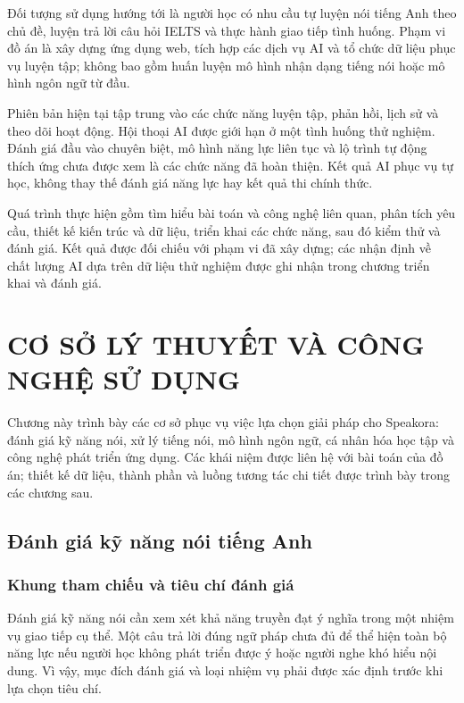 \documentclass[12pt,a4paper,oneside]{report}
\newcommand{\tieudetrang}[1]{\markboth{#1}{}}
\begin{document}
Đối tượng sử dụng hướng tới là người học có nhu cầu tự luyện nói tiếng Anh theo chủ đề, luyện trả lời câu hỏi IELTS và thực hành giao tiếp tình huống. Phạm vi đồ án là xây dựng ứng dụng web, tích hợp các dịch vụ AI và tổ chức dữ liệu phục vụ luyện tập; không bao gồm huấn luyện mô hình nhận dạng tiếng nói hoặc mô hình ngôn ngữ từ đầu.

Phiên bản hiện tại tập trung vào các chức năng luyện tập, phản hồi, lịch sử và theo dõi hoạt động. Hội thoại AI được giới hạn ở một tình huống thử nghiệm. Đánh giá đầu vào chuyên biệt, mô hình năng lực liên tục và lộ trình tự động thích ứng chưa được xem là các chức năng đã hoàn thiện. Kết quả AI phục vụ tự học, không thay thế đánh giá năng lực hay kết quả thi chính thức.

Quá trình thực hiện gồm tìm hiểu bài toán và công nghệ liên quan, phân tích yêu cầu, thiết kế kiến trúc và dữ liệu, triển khai các chức năng, sau đó kiểm thử và đánh giá. Kết quả được đối chiếu với phạm vi đã xây dựng; các nhận định về chất lượng AI dựa trên dữ liệu thử nghiệm được ghi nhận trong chương triển khai và đánh giá.



\chapter{CƠ SỞ LÝ THUYẾT VÀ CÔNG NGHỆ SỬ DỤNG}
\tieudetrang{CHƯƠNG 2. CƠ SỞ LÝ THUYẾT VÀ CÔNG NGHỆ}

Chương này trình bày các cơ sở phục vụ việc lựa chọn giải pháp cho Speakora: đánh giá kỹ năng nói, xử lý tiếng nói, mô hình ngôn ngữ, cá nhân hóa học tập và công nghệ phát triển ứng dụng. Các khái niệm được liên hệ với bài toán của đồ án; thiết kế dữ liệu, thành phần và luồng tương tác chi tiết được trình bày trong các chương sau.

\section{Đánh giá kỹ năng nói tiếng Anh}

\subsection{Khung tham chiếu và tiêu chí đánh giá}

Đánh giá kỹ năng nói cần xem xét khả năng truyền đạt ý nghĩa trong một nhiệm vụ giao tiếp cụ thể. Một câu trả lời đúng ngữ pháp chưa đủ để thể hiện toàn bộ năng lực nếu người học không phát triển được ý hoặc người nghe khó hiểu nội dung. Vì vậy, mục đích đánh giá và loại nhiệm vụ phải được xác định trước khi lựa chọn tiêu chí.
\end{document}
